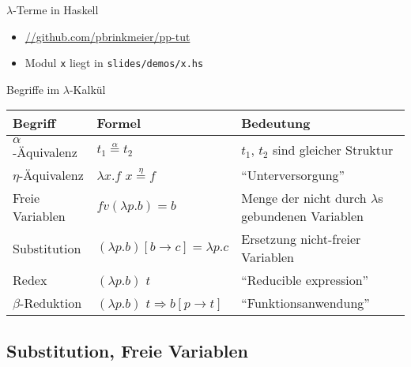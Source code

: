 \documentclass{beamer}
\newcommand{\code}[1]{
	\begin{mdframed}
		
	\end{mdframed}
}
\begin{document}
\begin{frame}{$\lambda$-Terme in Haskell}
	\code{demos/Lambda.hs}

	\begin{itemize}
		\item \url{//github.com/pbrinkmeier/pp-tut}
		\item Modul \texttt{x} liegt in \texttt{slides/demos/x.hs}
	\end{itemize}
\end{frame}

\newcommand{\aeq}{\stackrel{\alpha}{=}}
\newcommand{\naeq}{\stackrel{\alpha}{\neq}}
\newcommand{\eeq}{\stackrel{\eta}{=}}


\begin{frame}{Begriffe im $\lambda$-Kalkül}
	\fontsize{9pt}{13}\selectfont

	\begin{tabularx}{\textwidth}{ s | X | X }
		\textbf{Begriff} & \textbf{Formel} & \textbf{Bedeutung} \\
		\hline
		$\alpha$-Äquivalenz & $t_1 \aeq t_2$ & $t_1$, $t_2$ sind gleicher Struktur \\
		\hline
		$\eta$-Äquivalenz & $\lambda{}x.f$ $x \eeq f$ & \enquote{Unterversorgung} \\
		\hline
		Freie Variablen & $fv(\lambda{}p.b) = { b }$ & Menge der nicht durch $\lambda$s gebundenen Variablen \\
		\hline
		Substitution & $(\lambda{}p.b)\left[b\rightarrow{}c\right]=\lambda{}p.c$ & Ersetzung nicht-freier Variablen \\
		\hline
		Redex & $(\lambda{}p.b)$ $t$ & \enquote{Reducible expression} \\
		\hline
		$\beta$-Reduktion & $(\lambda{}p.b)$ $t \Rightarrow b\left[p\rightarrow{}t\right]$ & \enquote{Funktionsanwendung} \\
	\end{tabularx}
\end{frame}

\subsection{Substitution, Freie Variablen}
\end{document}
